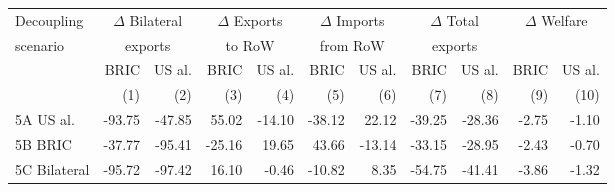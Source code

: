 \begin{tabular}{lrrrrrrrrrr}
  \hline
  Decoupling & \multicolumn{2}{c}{$\Delta$ Bilateral} & \multicolumn{2}{c}{$\Delta$ Exports} & \multicolumn{2}{c}{$\Delta$ Imports} & \multicolumn{2}{c}{$\Delta$ Total} & \multicolumn{2}{c}{$\Delta$ Welfare}\\
scenario & \multicolumn{2}{c}{exports} & \multicolumn{2}{c}{to RoW} & \multicolumn{2}{c}{from RoW} & \multicolumn{2}{c}{exports} & }\\\cmidrule{2-11}
& BRIC & US al. & BRIC & US al. & BRIC & US al. & BRIC & US al. & BRIC & US al.} \\
& (1) & (2) & (3) & (4) & (5) & (6) & (7) & (8) & (9) & (10)} \\
 \hline
5A US al. & -93.75 & -47.85 & 55.02 & -14.10 & -38.12 & 22.12 & -39.25 & -28.36 & -2.75 & -1.10 \\ 
  5B BRIC & -37.77 & -95.41 & -25.16 & 19.65 & 43.66 & -13.14 & -33.15 & -28.95 & -2.43 & -0.70 \\ 
  5C Bilateral & -95.72 & -97.42 & 16.10 & -0.46 & -10.82 & 8.35 & -54.75 & -41.41 & -3.86 & -1.32 \\ 
   \hline
\end{tabular}
